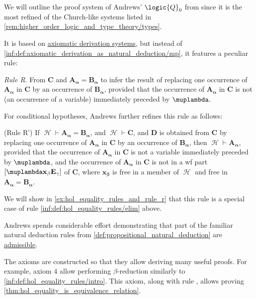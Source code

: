 \begin{remark}\label{rem:hol_axiomatic_derivations}
  We will outline the proof system of Andrews' \( \logic{Q}_0 \) from  since it is the most refined of the Church-like systems listed in \cref{rem:higher_order_logic_and_type_theory/types}.

  It is based on \hyperref[def:propositional_axiomatic_derivation_system]{axiomatic derivation systems}, but instead of \ref{inf:def:axiomatic_derivation_as_natural_deduction/mp}, it features a peculiar rule:
  \begin{displayquote}
    \textit{Rule R}. From \( \mathbf{C} \) and \( \mathbf{A_\alpha} = \mathbf{B_\alpha} \) to infer the result of replacing one occurrence of \( \mathbf{A_\alpha} \) in \( \mathbf{C} \) by an occurrence of \( \mathbf{B_\alpha} \), provided that the occurrence of \( \mathbf{A_\alpha} \) in \( \mathbf{C} \) is not (an occurrence of a variable) immediately preceded by \( \muplambda \).
  \end{displayquote}

  For conditional hypotheses, Andrews further refines this rule as follows:
  \begin{displayquote}
    (Rule R') If \( \mscrH \vdash \mathbf{A_\alpha} = \mathbf{B_\alpha} \), and \( \mscrH \vdash \mathbf{C} \), and \( \mathbf{D} \) is obtained from \( \mathbf{C} \) by replacing one occurrence of \( \mathbf{A_\alpha} \) in \( \mathbf{C} \) by an occurrence of \( \mathbf{B_\alpha} \), then \( \mscrH \vdash \mathbf{A_\alpha} \), provided that the occurrence of \( \mathbf{A_\alpha} \) in \( \mathbf{C} \) is not a variable immediately preceded by \( \mathbf{\muplambda} \), and the occurrence of \( \mathbf{A_\alpha} \) in \( \mathbf{C} \) is not in a wf part \( [\mathbf{\muplambda x_\beta E_\gamma}] \) of \( \mathbf{C} \), where \( \mathbf{x_\beta} \) is free in a member of \( \mscrH \) and free in \( \mathbf{A_\alpha} = \mathbf{B_\alpha} \).
  \end{displayquote}

  We will show in \cref{ex:hol_equality_rules_and_rule_r} that this rule is a special case of rule \ref{inf:def:hol_equality_rules/elim} above.

  Andrews spends considerable effort demonstrating that part of the familiar natural deduction rules from \cref{def:propositional_natural_deduction} are \hyperref[con:inference_rule_admissibility]{admissible}.

  The axioms are constructed so that they allow deriving many useful proofs. For example, axiom \( 4 \) allow performing \( \beta \)-reduction similarly to \ref{inf:def:hol_equality_rules/intro}. This axiom, along with rule , allows proving \cref{thm:hol_equality_is_equivalence_relation}.


\end{remark}
